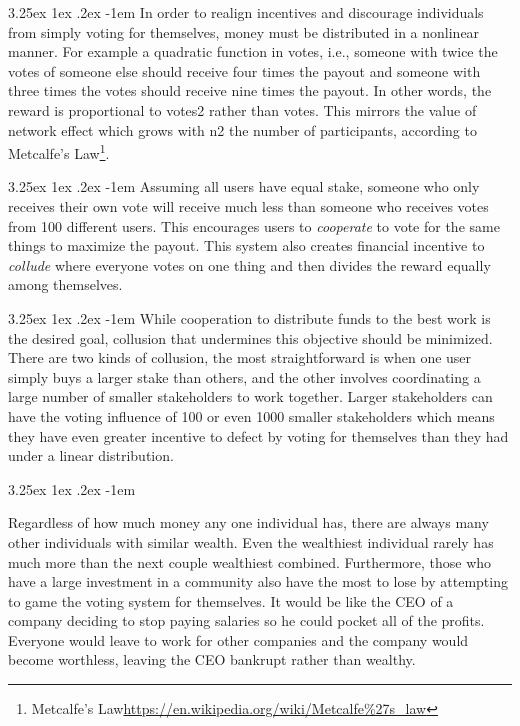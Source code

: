 \documentclass{article}
\makeatletter
\newcounter{subsubsubsection}[subsubsection]
\renewcommand\paragraph{\@startsection{paragraph}{5}{\z@}%
  {3.25ex \@plus1ex \@minus.2ex}%
  {-1em}%
  {\normalfont\normalsize\bfseries}}
\makeatother
\begin{document}
				\paragraph{}
					In order to realign incentives and discourage individuals from simply voting for themselves, money must be distributed in a nonlinear manner. For example a quadratic function in votes, i.e., someone with twice the votes of someone else should receive four times the payout and someone with three times the votes should receive nine times the payout. In other words, the reward is proportional to votes2 rather than votes. This mirrors the value of network effect which grows with n2 the number of participants, according to Metcalfe's Law\footnote{Metcalfe's Law\url{https://en.wikipedia.org/wiki/Metcalfe\%27s_law}}.

				\paragraph{}
					Assuming all users have equal stake, someone who only receives their own vote will receive much less than someone who receives votes from 100 different users. This encourages users to \textit{cooperate} to vote for the same things to maximize the payout. This system also creates financial incentive to \textit{collude} where everyone votes on one thing and then divides the reward equally among themselves.


					\paragraph{}
						While cooperation to distribute funds to the best work is the desired goal, collusion that undermines this objective should be minimized. There are two kinds of collusion, the most straightforward is when one user simply buys a larger stake than others, and the other involves coordinating a large number of smaller stakeholders to work together. Larger stakeholders can have the voting influence of 100 or even 1000 smaller stakeholders which means they have even greater incentive to defect by voting for themselves than they had under a linear distribution.

					\paragraph{}

						Regardless of how much money any one individual has, there are always many other individuals with similar wealth. Even the wealthiest individual rarely has much more than the next couple wealthiest combined. Furthermore, those who have a large investment in a community also have the most to lose by attempting to game the voting system for themselves. It would be like the CEO of a company deciding to stop paying salaries so he could pocket all of the profits. Everyone would leave to work for other companies and the company would become worthless, leaving the CEO bankrupt rather than wealthy.
\end{document}
